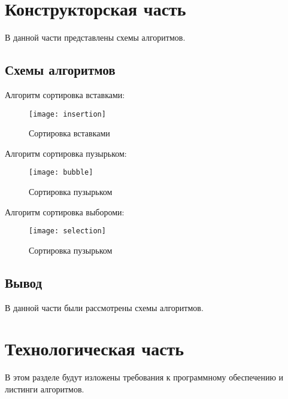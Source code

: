 \documentclass[a4paper, 14pt]{article}
\begin{document}
	\section{Конструкторская часть}
	
	В данной части представлены схемы алгоритмов.
	
	\subsection{Схемы алгоритмов}
	
	Алгоритм сортировка вставками:
	
	\begin{figure}[H]
        	\begin{center}
        		{\texttt{[image: insertion]}}
        		\caption{Сортировка вставками}
        	\end{center}
        \end{figure}
	
	Алгоритм сортировка пузырьком:
	
	\begin{figure}[H]
        	\begin{center}
        		{\texttt{[image: bubble]}}
        		\caption{Сортировка пузырьком}
        	\end{center}
        \end{figure}
			
	Алгоритм сортировка выбороми:
	
	\begin{figure}[H]
        	\begin{center}
        		{\texttt{[image: selection]}}
        		\caption{Сортировка пузырьком}
        	\end{center}
        \end{figure}
	
	\subsection{Вывод}
	
	В данной части были рассмотрены схемы алгоритмов.

	\newpage
	\section{Технологическая часть}
	
	В этом разделе будут изложены требования к программному обеспечению и листинги алгоритмов.
	
\end{document}
